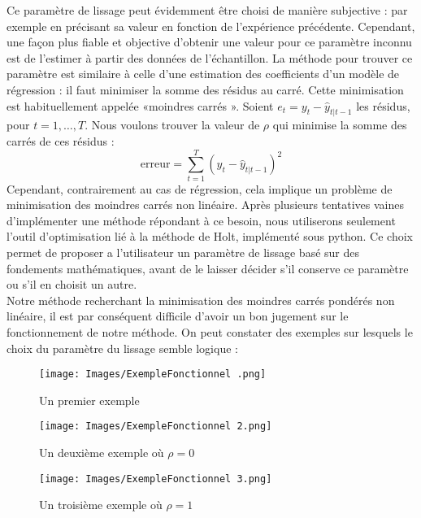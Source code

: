 \documentclass[a4paper,12pt]{article} %
\begin{document}
                Ce  paramètre de lissage peut évidemment être choisi de manière subjective : par exemple en précisant sa valeur en fonction de l'expérience précédente. Cependant, une façon plus fiable et objective d’obtenir une valeur pour ce paramètre inconnu est de l'estimer à partir des données de l'échantillon. La méthode pour trouver ce paramètre est similaire à celle d'une estimation des coefficients d’un modèle de régression :  il faut minimiser la somme des résidus au carré. Cette minimisation est habituellement appelée «moindres carrés ». Soient $e_t=y_t - \hat{y}_{t|t-1}$ les résidus, pour $t=1,\dots,T$. Nous voulons trouver la valeur de $\rho$ qui minimise la somme des carrés de ces résidus :\\
                $$\text{erreur} =\sum_{t=1}^T (y_t - \hat{y}_{t|t-1})^2
                $$
                Cependant, contrairement au cas de régression, cela implique un problème de minimisation des moindres carrés non linéaire.
                Après plusieurs tentatives vaines d'implémenter une méthode répondant à ce besoin, nous utiliserons seulement  l'outil d’optimisation lié à la méthode de Holt, implémenté sous python. Ce choix permet de proposer a l'utilisateur un paramètre de lissage basé sur des fondements mathématiques, avant de le laisser décider s'il conserve ce paramètre ou s'il en choisit un autre.\\
                
                Notre méthode recherchant la minimisation des moindres carrés pondérés non linéaire, il est par conséquent difficile d'avoir un bon jugement sur le fonctionnement de notre méthode. On peut constater des exemples sur lesquels le choix du paramètre du lissage semble logique :
                
                \begin{figure}[!htb]
                    \texttt{[image: Images/ExempleFonctionnel .png]}
                     \caption{Un premier exemple}\label{fig:Exemplefonctionnel}
                \endminipage\hfill
                    \texttt{[image: Images/ExempleFonctionnel 2.png]}
                     \caption{Un deuxième exemple où $\rho = 0 $}\label{fig:Exemplefonctionnel2}
                \endminipage\hfill
                    \texttt{[image: Images/ExempleFonctionnel 3.png]}
                    \caption{Un troisième exemple où $\rho = 1 $}\label{fig:Exemplefonctionnel3}
                \endminipage
                \end{figure}
                
\end{document}
